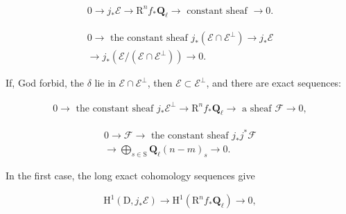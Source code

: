 \documentclass[10pt,leqno]{article}
\begin{document}
\begin{equation*}\begin{gathered}0 \longrightarrow  j_{*}\mathcal{E}  \longrightarrow  \mathrm{R}^{n} f_{*}\mathbf{Q}_{\ell } \longrightarrow \text{ constant sheaf }\longrightarrow  0.\end{gathered}\tag{7.1.2}\end{equation*}

\begin{equation*}\begin{gathered}0 \longrightarrow \text{ the constant sheaf }j_{*}(\mathcal{E} \cap \mathcal{E} ^{\perp }) \longrightarrow  j_{*}\mathcal{E}  \\ \longrightarrow  j_{*}(\mathcal{E} /(\mathcal{E} \cap \mathcal{E} ^{\perp })) \longrightarrow  0.\end{gathered}\tag{7.1.3}\end{equation*}

\noindent If, God forbid, the \(\delta \) lie in \(\mathcal{E} \cap \mathcal{E} ^{\perp }\), then \(\mathcal{E} \subset \mathcal{E} ^{\perp }\), and there are exact sequences:\par

\begin{equation*}\begin{gathered}0 \longrightarrow \text{ the constant sheaf }j_{*}\mathcal{E} ^{\perp } \longrightarrow  \mathrm{R}^{n} f_{*}\mathbf{Q}_{\ell } \longrightarrow \text{ a sheaf }\mathcal{F}  \longrightarrow  0,\end{gathered}\tag{7.1.4}\end{equation*}

\begin{equation*}\begin{gathered}0 \longrightarrow  \mathcal{F}  \longrightarrow \text{ the constant sheaf }j_{*}j^{*}\mathcal{F}  \\ \longrightarrow  \bigoplus\limits_{s\in \mathrm{S}} \mathbf{Q}_{\ell }(n- m)_{s} \longrightarrow  0.\end{gathered}\tag{7.1.5}\end{equation*}

\noindent In the first case, the long exact cohomology sequences give\par

\begin{equation*}\begin{gathered}\mathrm{H}^{1}(\mathrm{D},j_{*}\mathcal{E} ) \longrightarrow  \mathrm{H}^{1}(\mathrm{R}^{n} f_{*}\mathbf{Q}_{\ell }) \longrightarrow  0,\end{gathered}\tag{7.1.2′}\end{equation*}
\end{document}
